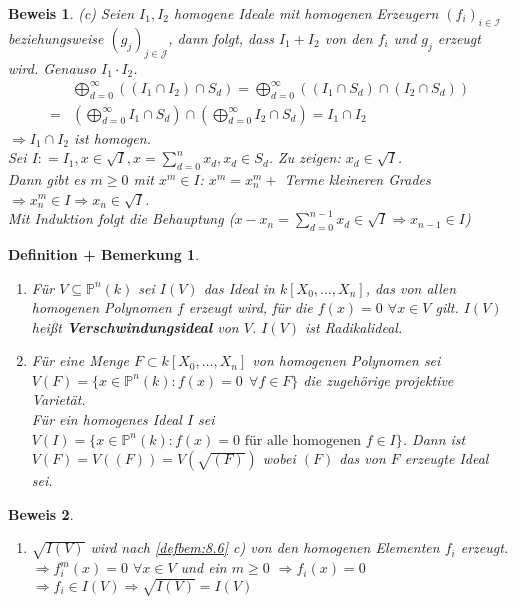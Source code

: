 \documentclass[a4paper,12pt]{report}
\theoremstyle{break}
\newtheorem{DefBem}[Def]{Definition + Bemerkung}
\theoremstyle{nonumberbreak}
\theoremstyle{nonumberplain}
\newtheorem{Bew}{Beweis}
\newcommand{\emp}[1]{\textbf{\emph{#1}}}
\newcommand{\begriff}[1]{{\index{#1}}\emp{#1}}
\newcommand{\defeqr}[0]{\mathrel{\mathop:}=}
\begin{document}
\begin{Bew}
  (c) Seien $I_1,I_2$ homogene Ideale mit homogenen Erzeugern $(f_i)_{i\in \mathcal I}$ beziehungsweise
    $(g_j)_{j\in \mathcal J}$, dann folgt, dass $I_1+I_2$ von den $f_i$ und $g_j$ erzeugt wird. Genauso $I_1\cdot I_2$. \\
    \begin{align*}
      & \bigoplus_{d=0}^\infty((I_1\cap I_2)\cap S_d)=\bigoplus_{d=0}^\infty((I_1\cap S_d)\cap (I_2\cap S_d)) \\
      = & \left(\bigoplus_{d=0}^\infty I_1\cap S_d\right)\cap \left(\bigoplus_{d=0}^\infty I_2\cap S_d\right)=I_1\cap I_2
    \end{align*}
    $\Rightarrow I_1\cap I_2$ ist homogen.\\
    Sei $I\defeqr I_1, x\in\sqrt{I},x=\sum_{d=0}^nx_d,x_d\in S_d$. Zu zeigen: $x_d\in\sqrt{I}$.\\
    Dann gibt es $m\geq 0$ mit $x^m\in I$: $x^m=x_n^m+$ Terme kleineren Grades \\
    $\Rightarrow x_n^m\in I \Rightarrow x_n\in\sqrt{I}$.\\
Mit Induktion folgt die Behauptung ($x-x_n=\sum_{d=0}^{n-1}x_d\in\sqrt{I}\Rightarrow x_{n-1}\in I$)
 \end{Bew}
\begin{DefBem}
 \begin{enumerate}
  \item Für $V \subseteq \mathbb P^n(k)$ sei $I(V)$ das Ideal in $k[X_0,\dots,X_n]$, das von allen homogenen Polynomen $f$ erzeugt wird, für die $f(x)=0 $ $\forall x \in V$ gilt. $I(V)$ heißt \begriff{Verschwindungsideal} von $V$. $I(V)$ ist Radikalideal.
  \item Für eine Menge $F \subset k[X_0,\dots,X_n]$ von homogenen Polynomen sei $V(F)=\{ x \in \mathbb P^n(k):f(x)=0~~ \forall f \in F \}$ die zugehörige projektive Varietät. \\ 
  Für ein homogenes Ideal $I$ sei $V(I)=\{ x \in \mathbb P^n(k):f(x)=0  \text{ für alle homogenen } f \in I \} $. Dann ist $V(F)=V((F))=V(\sqrt{(F)})$ wobei $(F)$ das von $F$ erzeugte Ideal sei.
 \end{enumerate}
\end{DefBem}
\begin{Bew}
 \begin{enumerate}
  \item $\sqrt{I(V)}$ wird nach \ref{defbem:8.6} c) von den homogenen Elementen $f_i$ erzeugt.\\
	$\Rightarrow f_i^m(x) = 0$ $\forall x \in V$ und ein $m \ge 0$ $\Rightarrow f_i(x)=0$ $\Rightarrow f_i \in I(V) \Rightarrow \sqrt{I(V)} = I(V)$
 \end{enumerate}
\end{Bew}
\end{document}
